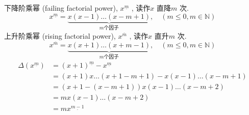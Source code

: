 \documentclass[mode=geye, chinesefont=founder]{elegantnote}
\newcommand{\fallingfactorial}[1]{%
  ^{\underline{#1}}%
}
\newcommand{\risingfactorial}[1]{%
  ^{\overline{#1}}%
}
\begin{document}
下降阶乘幂 (failing factorial power), $ x\fallingfactorial{m} $ , 读作$ x $ 直降$ m $ 次.\\
\begin{equation*}
    x\fallingfactorial{m} = \underbrace{x(x-1)\dots(x-m+1)}_{\textit{m个因子}}, \quad (m\leqslant 0, m\in\mathbb{N}) 
\end{equation*}
上升阶乘幂 (rising factorial power), $ x\risingfactorial{m} $ , 读作$ x $ 直升$ m $ 次.\\
\begin{equation*}
    x\risingfactorial{m} = \underbrace{x(x+1)\dots(x+m-1)}_{\textit{m个因子}}, \quad (m\leqslant 0, m\in\mathbb{N}) 
\end{equation*}
\begin{align*}
    \Delta(x\fallingfactorial{m}) &= (x+1)\fallingfactorial{m}-x\fallingfactorial{m} \\
    &= (x+1)x\dots(x+1-m+1) - x(x-1)\dots(x-m+1) \\
    &= (x+1-(x-m+1))x(x-1)\dots(x-m+2) \\
    &= mx(x-1)\dots(x-m+2) \\
    &= mx\fallingfactorial{m-1}
\end{align*}
\end{document}
